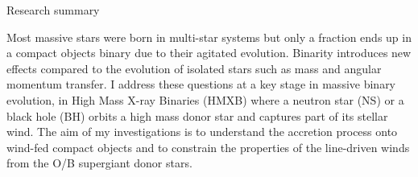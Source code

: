 \documentclass[letterpaper,12pt,onecolumn]{article}
\makeatletter
\newcommand*{\hmxb}{HMXB\@\xspace}
\newcommand*{\ns}{NS\@\xspace}
\newcommand*{\bh}{BH\@\xspace}
\makeatother
\begin{document}



\renewcommand{\headrulewidth}{0pt}
\pagestyle{fancy}
\rhead{}
\rfoot{\thepage / \pageref{LastPage}}

\begin{center}
\vspace*{-1.2cm}
\Large Research summary
\end{center}
\normalfont

\vspace*{0.4cm}



%

Most massive stars were born in multi-star systems but only a fraction ends up in a compact objects binary due to their agitated evolution. Binarity introduces new effects compared to the evolution of isolated stars such as mass and angular momentum transfer. I address these questions at a key stage in massive binary evolution, in High Mass X-ray Binaries (\hmxb) where a neutron star (\ns) or a black hole (\bh) orbits a high mass donor star and captures part of its stellar wind. The aim of my investigations is to understand the accretion process onto wind-fed compact objects and to constrain the properties of the line-driven winds from the O/B supergiant donor stars.
\end{document}
